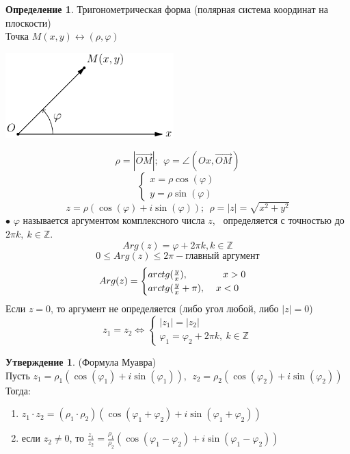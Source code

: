 \documentclass[a4paper, 12pt]{article}
\newcommand{\Z}{\mathbb Z}
\renewcommand{\phi}{\varphi}
\newcommand\tab[1][.5cm]{\hspace*{#1}}
\theoremstyle{definition}
\newtheorem*{definition}{Определение}
\newtheorem*{subtheorem}{Утверждение}
\begin{document}
  \begin{definition}
    Тригонометрическая форма (полярная система координат на плоскости) \\
    Точка $M(x, y) \longleftrightarrow (\rho, \phi)$
    \begin{center}
      \includegraphics[width=6.5cm]{image/lecture-19.pdf}
    \end{center}
    $$\rho = |\overrightarrow{OM}|; \ \ \phi = \angle(Ox, \overrightarrow{OM})$$
    $$\begin{cases}
      x = \rho \cos(\phi)\\
      y = \rho \sin(\phi)
    \end{cases}$$ 
    $$z = \rho(\cos(\phi)+i\sin(\phi)); \ \ 
    \rho = |z| = \sqrt{x^2+y^2}$$
    $\bullet$ $\phi$ называется аргументом комплексного числа $z$, \ определяется с точностью до $2\pi k, \ k \in \Z$.
    $$Arg(z) = \phi + 2 \pi k, k \in \Z$$
    $$0\leq Arg(z)\leq2\pi - \text{главный аргумент}$$
    $$Arg(z) = \begin{cases}
      arctg(\frac{y}{x}), \tab[1.3cm] x>0 \\
      arctg(\frac{y}{x}+\pi), \tab[0.4cm] x<0
    \end{cases}$$ 
    Если $z = 0$, то аргумент не определяется (либо угол любой, либо $|z| = 0$)
    $$z_1 = z_2 \Longleftrightarrow \begin{cases}
      |z_1| = |z_2| \\
      \phi_1 = \phi_2 + 2\pi k, \ k\in \Z
    \end{cases}$$ 
  \end{definition} 
  \begin{subtheorem} (Формула Муавра)\\
    Пусть $z_1 = \rho_1(\cos(\phi_1) + i\sin(\phi_1)), \ \ z_2 = \rho_2(\cos(\phi_2) + i\sin(\phi_2))$ \\
    Тогда:
    \begin{enumerate}
      \item $z_1 \cdot z_2 = (\rho_1 \cdot \rho_2)(\cos(\phi_1+\phi_2) + i\sin(\phi_1+\phi_2))$
      \item если $z_2 \neq 0$, то $\frac{z_1}{z_2} = \frac{\rho_1}{\rho_2} (\cos(\phi_1-\phi_2) + i\sin(\phi_1-\phi_2))$  
    \end{enumerate}
  \end{subtheorem} 
\end{document}
